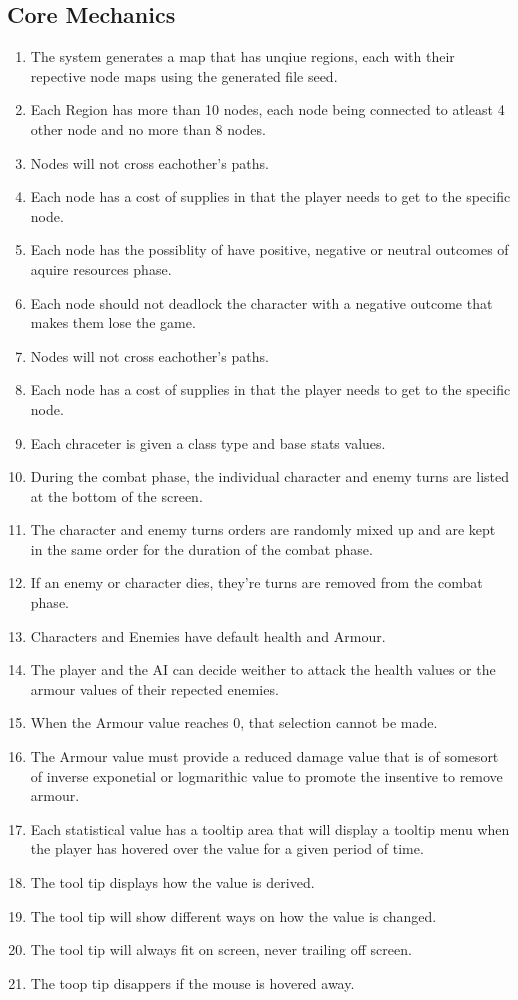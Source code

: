 \documentclass{article}
\begin{document}
\subsection{Core Mechanics}
\begin{enumerate}[{CMR}1. ]
	\item The system generates a map that has unqiue regions, each with their repective node maps using the generated file seed.
	\item Each Region has more than 10 nodes, each node being connected to atleast 4 other node and no more than 8 nodes.
	\item Nodes will not cross eachother's paths.
	\item Each node has a cost of supplies in that the player needs to get to the specific node.
	\item Each node has the possiblity of have positive, negative or neutral outcomes of aquire resources phase.
	\item Each node should not deadlock the character with a negative outcome that makes them lose the game.
	\item Nodes will not cross eachother's paths.
	\item Each node has a cost of supplies in that the player needs to get to the specific node.
	\item Each chraceter is given a class type and base stats values.
	\item During the combat phase, the individual character and enemy turns are listed at the bottom of the screen.
	\item The character and enemy turns orders are randomly mixed up and are kept in the same order for the duration of the combat phase.
	\item If an enemy or character dies, they're turns are removed from the combat phase.
	\item Characters and Enemies have default health and Armour.
	\item The player and the AI can decide weither to attack the health values or the armour values of their repected enemies.
	\item When the Armour value reaches 0, that selection cannot be made.
	\item The Armour value must provide a reduced damage value that is of somesort of inverse exponetial or logmarithic value to promote the insentive to remove armour.
	\item Each statistical value has a tooltip area that will display a tooltip menu when the player has hovered over the value for a given period of time.
	\item The tool tip displays how the value is derived.
	\item The tool tip will show different ways on how the value is changed.
	\item The tool tip will always fit on screen, never trailing off screen.
	\item The toop tip disappers if the mouse is hovered away.
\end{enumerate}
\end{document}
